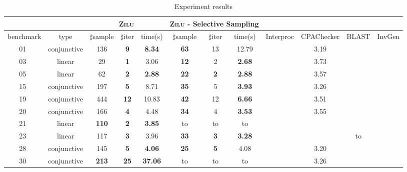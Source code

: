 \begin{table}[!h]
\centering
\caption{Experiment results}
{\scriptsize \begin{tabular}{l c | c c c | c c c | c | c | c | c |}
\cline{3-8}
& &\multicolumn{3}{|c|}{\textsc{Zilu}}&\multicolumn{3}{c|}{\textsc{Zilu} - Selective Sampling} \\
\hline
\multicolumn{1}{|c|}{benchmark}&\multicolumn{1}{|c|}{type}& $\sharp$sample & $\sharp$iter & time(s) & $\sharp$sample & $\sharp$iter &time(s) & Interproc & CPAChecker & BLAST & InvGen \\
\hline
\multicolumn{1}{|c|}{01~\cite{isil2013inductive}}				&conjunctive	&136  	&\textbf{9}			&\textbf{8.34}		&\textbf{63}	&13			&12.79 & \cmark  	&3.19	  		& \cmark		& \cmark \\
\multicolumn{1}{|c|}{03~\cite{isil2013inductive}}				&linear			&29 	&\textbf{1} 		&3.06       		&\textbf{12} 	&2  		&\textbf{2.68} & \cmark 	&3.73	  		& \cmark		& \cmark \\
\multicolumn{1}{|c|}{05~\cite{isil2013inductive}}				&linear 		&62 	&\textbf{2} 		&\textbf{2.88} 		&\textbf{22} 	&\textbf{2}	&\textbf{2.88} & \cmark  	&3.57	  		& \cmark 		& \cmark  \\
\multicolumn{1}{|c|}{15~\cite{isil2013inductive}}				&conjunctive	&197	&\textbf{5} 		&8.71     			&\textbf{35}	&5 			&\textbf{3.93}  & \cmark	&3.26	  		& \cmark 		& \cmark \\
\multicolumn{1}{|c|}{19~\cite{isil2013inductive}}				&conjunctive	&444	&\textbf{12}		&10.83    			&\textbf{42}	&12			&\textbf{6.66}  & \xmark  	&3.51	  		& \cmark 		& \cmark \\
\multicolumn{1}{|c|}{20~\cite{isil2013inductive}}				&conjunctive	&166	&\textbf{4} 		&4.48     			&\textbf{34}	&4 			&\textbf{3.53}  & \cmark 	&3.55	  		& \cmark 		& \cmark \\
\multicolumn{1}{|c|}{21~\cite{isil2013inductive}}				&linear			&\textbf{110}	&\textbf{2} &\textbf{3.85}     	&to				&to			&to  & \xmark  	&\xmark	  		& \xmark 	& \xmark \\
\multicolumn{1}{|c|}{23~\cite{isil2013inductive}}				&linear			&117	&\textbf{3} 		&3.96     			&\textbf{33}	&\textbf{3}	&\textbf{3.28} & \xmark  	&\xmark	  		& to 		& \cmark  \\
\multicolumn{1}{|c|}{28~\cite{isil2013inductive}}				&conjunctive	&145	&\textbf{5} 		&\textbf{4.06}     	&\textbf{25}	&\textbf{5}	&4.08 & \cmark 	&3.20	  		& \cmark		& \cmark \\
\multicolumn{1}{|c|}{30~\cite{isil2013inductive}}				&conjunctive	&\textbf{213}	&\textbf{25}&\textbf{37.06}		&to				&to 		&to & \xmark  	&3.26	  		& \cmark 	& \cmark \\

\end{tabular}}
\end{table}
